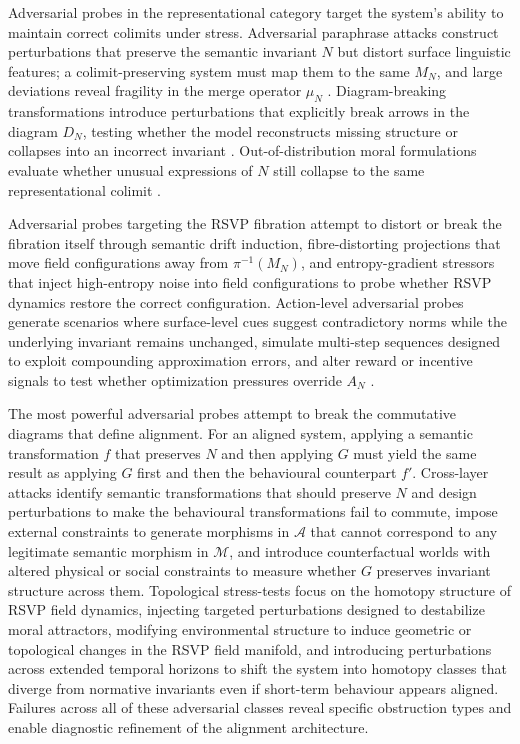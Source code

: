 \documentclass[12pt]{article}
\theoremstyle{definition}
\begin{document}
Adversarial probes in the representational category target the system's ability
to maintain correct colimits under stress. Adversarial paraphrase attacks
construct perturbations that preserve the semantic invariant $N$ but distort
surface linguistic features; a colimit-preserving system must map them to the
same $M_N$, and large deviations reveal fragility in the merge operator $\mu_N$
\citep{iyyer2018}. Diagram-breaking transformations introduce perturbations that
explicitly break arrows in the diagram $D_N$, testing whether the model
reconstructs missing structure or collapses into an incorrect invariant
\citep{spivak2014}. Out-of-distribution moral formulations evaluate whether
unusual expressions of $N$ still collapse to the same representational colimit
\citep{Tomasello2016}.

Adversarial probes targeting the RSVP fibration attempt to distort or break the
fibration itself through semantic drift induction, fibre-distorting projections
that move field configurations away from $\pi^{-1}(M_N)$, and entropy-gradient
stressors that inject high-entropy noise into field configurations to probe
whether RSVP dynamics restore the correct configuration. Action-level adversarial
probes generate scenarios where surface-level cues suggest contradictory norms
while the underlying invariant remains unchanged, simulate multi-step sequences
designed to exploit compounding approximation errors, and alter reward or
incentive signals to test whether optimization pressures override $A_N$
\citep{krakovna2020}.

The most powerful adversarial probes attempt to break the commutative diagrams
that define alignment. For an aligned system, applying a semantic transformation
$f$ that preserves $N$ and then applying $G$ must yield the same result as
applying $G$ first and then the behavioural counterpart $f'$. Cross-layer
attacks identify semantic transformations that should preserve $N$ and design
perturbations to make the behavioural transformations fail to commute, impose
external constraints to generate morphisms in $\mathcal{A}$ that cannot
correspond to any legitimate semantic morphism in $\mathcal{M}$, and introduce
counterfactual worlds with altered physical or social constraints to measure
whether $G$ preserves invariant structure across them. Topological stress-tests
focus on the homotopy structure of RSVP field dynamics, injecting targeted
perturbations designed to destabilize moral attractors, modifying environmental
structure to induce geometric or topological changes in the RSVP field manifold,
and introducing perturbations across extended temporal horizons to shift the
system into homotopy classes that diverge from normative invariants even if
short-term behaviour appears aligned. Failures across all of these adversarial
classes reveal specific obstruction types and enable diagnostic refinement of
the alignment architecture.
\end{document}
